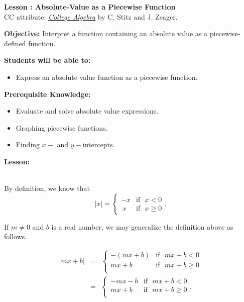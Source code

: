 \documentclass[12pt]{article}
\theoremstyle{definition}
\begin{document}
{\bf \large Lesson : Absolute-Value as a Piecewise Function}\label{les:absolute_as_piecewise}
\\ CC attribute: \href{http://www.stitz-zeager.com}{\it{College Algebra}} by C. Stitz and J. Zeager. 
\hfill \doclicenseImage[imagewidth=5em]\\
\par
{\bf Objective:} Interpret a function containing an absolute value as a piecewise-defined function.\\
\par
{\bf Students will be able to:}
\begin{itemize}
	\item Express an absolute value function as a piecewise function.
\end{itemize}
{\bf Prerequisite Knowledge:}
\begin{itemize}
	\item Evaluate and solve absolute value expressions.
	\item Graphing piecewise functions.
	\item Finding $x-$ and $y-$intercepts.
\end{itemize}
\hrulefill

{\bf Lesson:}\\
\ \par
By definition, we know that \[ |x| =  \begin{cases}
-x & \text{if~~} x < 0 \\
~x & \text{if~~} x \geq 0
\end{cases}.\] 

If $m\neq 0$ and $b$ is a real number, we may generalize the definition above as follows.

\begin{eqnarray*}
|mx+b| &=&  \begin{cases} -(mx+b)  & \text{if~~} mx+b < 0  \\
 mx+b~ & \text{if~~} mx+b \geq 0 \\ \end{cases}\\
&=&\begin{cases} -mx-b & \text{if~~} mx+b < 0  \\ mx+b & \text{if~~} mx+b \geq 0 \\ \end{cases}.
\end{eqnarray*}
\end{document}
